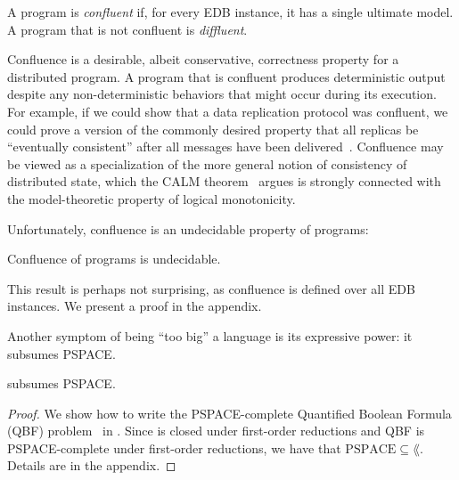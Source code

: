 \begin{definition}
  A \lang program is {\em confluent} if, for every EDB instance, it has a single ultimate model.  A program that is not confluent is {\em diffluent}.
\end{definition}


Confluence is a desirable, albeit conservative, correctness property for a
distributed program.  A program that is confluent produces deterministic output
despite any non-deterministic behaviors that might occur during its
execution. For example, if we could show that a data replication protocol was
confluent, we could prove a version of the commonly desired property that all
replicas be ``eventually consistent'' after all messages have been
delivered~\cite{bayou,vogels-ec}.  Confluence may be viewed as a specialization of the
more general notion of consistency of distributed state, which the CALM
theorem~\cite{declarative-imperative} argues is strongly connected with the
model-theoretic property of logical monotonicity.

Unfortunately, confluence is an undecidable property of \lang programs:

\begin{lemma}
\label{lem:confluence-undecidable}
Confluence of \lang programs is undecidable.
\end{lemma}
This result is perhaps not surprising, as confluence is defined over all EDB instances.  We present a proof in the appendix.


Another symptom of \lang being ``too big'' a language is its expressive power: it subsumes PSPACE.  

\begin{lemma}
\label{lem:lang-pspace}
\lang %
subsumes PSPACE.
\end{lemma}

\begin{proof}

We show how to write the PSPACE-complete Quantified Boolean Formula (QBF) problem~\cite{garey-johnson} in \lang. Since \lang is closed under first-order reductions and QBF is PSPACE-complete under first-order reductions, we have that $\text{PSPACE} \subseteq \lang$.  Details are in the appendix.
\end{proof}

